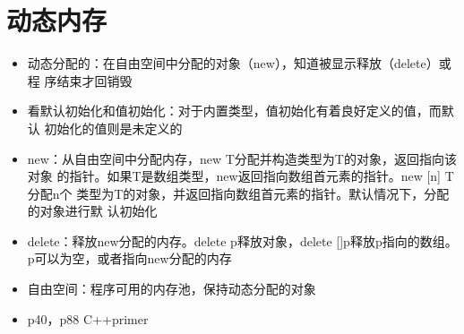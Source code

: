 \documentclass[11pt]{article}
\begin{document}
\section{动态内存}
\label{sec-9}
\begin{itemize}
\item 动态分配的：在自由空间中分配的对象（new），知道被显示释放（delete）或程
序结束才回销毁
\item 看默认初始化和值初始化：对于内置类型，值初始化有着良好定义的值，而默认
初始化的值则是未定义的
\item new：从自由空间中分配内存，new T分配并构造类型为T的对象，返回指向该对象
的指针。如果T是数组类型，new返回指向数组首元素的指针。new [n] T分配n个
类型为T的对象，并返回指向数组首元素的指针。默认情况下，分配的对象进行默
认初始化
\item delete：释放new分配的内存。delete p释放对象，delete []p释放p指向的数组。
p可以为空，或者指向new分配的内存
\item 自由空间：程序可用的内存池，保持动态分配的对象
\item p40，p88 C++primer
\end{itemize}
\end{document}
